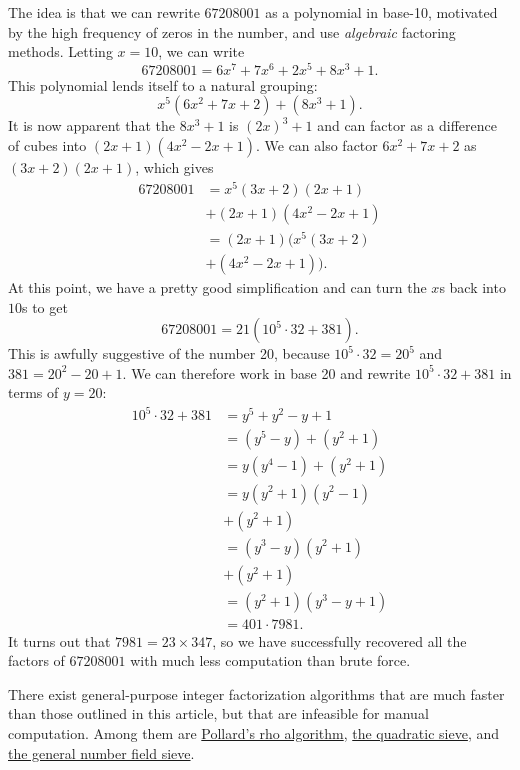 \documentclass{article}
\begin{document}
\begin{multicols}{3}
The idea is that we can rewrite $67208001$ as a polynomial in base-10, motivated by the high frequency of zeros in the number, and use \textit{algebraic} factoring methods. Letting $x = 10$, we can write
$$67208001 = 6x^7 + 7x^6 + 2x^5 + 8x^3 + 1.$$
This polynomial lends itself to a natural grouping:
$$x^5(6x^2 + 7x + 2) + (8x^3 + 1).$$
It is now apparent that the $8x^3 + 1$ is $(2x)^3 + 1$ and can factor as a difference of cubes into $(2x + 1)(4x^2 - 2x + 1)$. We can also factor $6x^2 + 7x + 2$ as $(3x + 2)(2x + 1)$, which gives
\begin{align*}
    67208001 &= x^5(3x + 2)(2x + 1) \\
    & + (2x + 1)(4x^2 - 2x + 1) \\
    &= (2x + 1)(x^5(3x + 2) \\
    &+ (4x^2 - 2x + 1)). \tag{factoring out the $2x + 1$}
\end{align*}
At this point, we have a pretty good simplification and can turn the $x$s back into $10$s to get
$$67208001 = 21 (10^5 \cdot 32 + 381).$$
This is awfully suggestive of the number 20, because $10^5 \cdot 32 = 20^5$ and $381 = 20^2 - 20 + 1$. We can therefore work in base 20 and rewrite $10^5 \cdot 32 + 381$ in terms of $y = 20$:
\begin{align*}
    10^5 \cdot 32 + 381 &= y^5 + y^2 - y + 1 \\
    &= (y^5 - y) + (y^2 + 1) \\
    &= y(y^4 - 1) + (y^2 + 1) \\
    &= y(y^2 + 1)(y^2 - 1) \\
    &+ (y^2 + 1) \tag{by difference of squares} \\
    &= (y^3 - y)(y^2 + 1) \\
    & + (y^2 + 1) \\
    &= (y^2 + 1)(y^3 - y + 1) \\
    &= 401 \cdot 7981.
\end{align*}
It turns out that $7981 = 23 \times 347$, so we have successfully recovered all the factors of $67208001$ with much less computation than brute force.

\bigskip

There exist general-purpose integer factorization algorithms that are much faster than those outlined in this article, but that are infeasible for manual computation. Among them are
\href{https://en.wikipedia.org/wiki/Pollard's_rho_algorithm}{Pollard's rho algorithm},
\href{https://en.wikipedia.org/wiki/Quadratic_sieve}{the quadratic sieve},
and \href{https://en.wikipedia.org/wiki/General_number_field_sieve}{the general number field sieve}.
\closearticle


\end{multicols}
\end{document}
